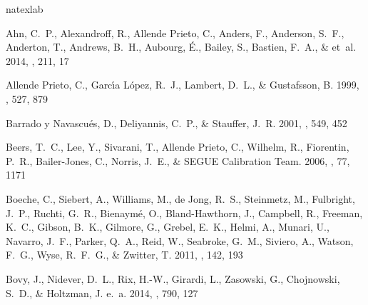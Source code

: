 \documentclass[12pt, preprint]{aastex}
\begin{document}
\begin{thebibliography}{24}
\expandafter\ifx\csname natexlab\endcsname\relax\def\natexlab#1{#1}\fi

{Ahn}, C.~P., {Alexandroff}, R., {Allende Prieto}, C., {Anders}, F.,
  {Anderson}, S.~F., {Anderton}, T., {Andrews}, B.~H., {Aubourg}, {\'E}.,
  {Bailey}, S., {Bastien}, F.~A., \& et~al. 2014, \apjs, 211, 17

{Allende Prieto}, C., {Garc{\'{\i}}a L{\'o}pez}, R.~J., {Lambert}, D.~L., \&
  {Gustafsson}, B. 1999, \apj, 527, 879

{Barrado y Navascu{\'e}s}, D., {Deliyannis}, C.~P., \& {Stauffer}, J.~R. 2001,
  \apj, 549, 452

{Beers}, T.~C., {Lee}, Y., {Sivarani}, T., {Allende Prieto}, C., {Wilhelm}, R.,
  {Fiorentin}, P.~R., {Bailer-Jones}, C., {Norris}, J.~E., \& {SEGUE
  Calibration Team}. 2006, \memsai, 77, 1171

{Boeche}, C., {Siebert}, A., {Williams}, M., {de Jong}, R.~S., {Steinmetz}, M.,
  {Fulbright}, J.~P., {Ruchti}, G.~R., {Bienaym{\'e}}, O., {Bland-Hawthorn},
  J., {Campbell}, R., {Freeman}, K.~C., {Gibson}, B.~K., {Gilmore}, G.,
  {Grebel}, E.~K., {Helmi}, A., {Munari}, U., {Navarro}, J.~F., {Parker},
  Q.~A., {Reid}, W., {Seabroke}, G.~M., {Siviero}, A., {Watson}, F.~G., {Wyse},
  R.~F.~G., \& {Zwitter}, T. 2011, \aj, 142, 193

{Bovy}, J., {Nidever}, D.~L., {Rix}, H.-W., {Girardi}, L., {Zasowski}, G.,
  {Chojnowski}, S.~D., \& {Holtzman}, J. e.~a. 2014, \apj, 790, 127


\end{thebibliography}
\end{document}
